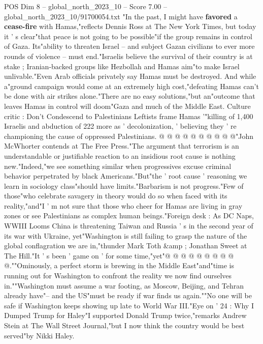 \begin{textsample}{POS Dim 8 – global\_north\_2023\_10 – Score 7.00 – global\_north\_2023\_10/91700054.txt}  \label{ex:f8_pos_245}
"In the past, I might have \textbf{favored} a \textbf{cease-fire} with Hamas,"reflects Dennis Ross at The New York Times, but today it ' s clear"that peace is not going to be possible"if the group remains in control of Gaza.
Its"ability to threaten Israel -- and subject Gazan civilians to ever more rounds of violence -- must end."Israelis believe the survival of their country is at stake ; Iranian-backed groups like Hezbollah and Hamas aim"to make Israel unlivable."Even Arab officials privately say Hamas must be destroyed.
And while a"ground campaign would come at an extremely high cost,"defeating Hamas can't be done with air strikes alone."There are no easy solutions,"but an"outcome that leaves Hamas in control will doom"Gaza and much of the Middle East.
Culture critic : Don't Condescend to Palestinians Leftists frame Hamas '"killing of 1,400 Israelis and abduction of 222 more as ' decolonization, ' believing they ' re championing the cause of oppressed Palestinians. @ @ @ @ @ @ @ @ @ @"John McWhorter contends at The Free Press."The argument that terrorism is an understandable or justifiable reaction to an insidious root cause is nothing new."Indeed,"we see something similar when progressives excuse criminal behavior perpetrated by black Americans."But"the ' root cause ' reasoning we learn in sociology class"should have limits."Barbarism is not progress."Few of those"who celebrate savagery in theory would do so when faced with its reality,"and"I ' m not sure that those who cheer for Hamas are living in gray zones or see Palestinians as complex human beings."Foreign desk : As DC Naps, WWIII Looms China is threatening Taiwan and Russia ' s in the second year of its war with Ukraine, yet"Washington is still failing to grasp the nature of the global conflagration we are in,"thunder Mark Toth \&amp ; Jonathan Sweet at The Hill."It ' s been ' game on ' for some time,"yet"@ @ @ @ @ @ @ @ @ @.""Ominously, a perfect storm is brewing in the Middle East"and"time is running out for Washington to confront the reality we now find ourselves in.""Washington must assume a war footing, as Moscow, Beijing, and Tehran already have"-- and the US"must be ready if war finds us again.""No one will be safe if Washington keeps showing up late to World War III."Eye on ' 24 : Why I Dumped Trump for Haley"I supported Donald Trump twice,"remarks Andrew Stein at The Wall Street Journal,"but I now think the country would be best served"by Nikki Haley.

\end{textsample}
